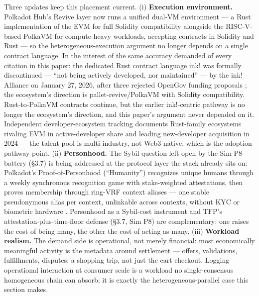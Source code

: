 \documentclass[11pt,twocolumn]{article}
\begin{document}
Three updates keep this placement current. (i)
\textbf{Execution environment.} Polkadot Hub's Revive layer now runs a
unified dual-VM environment --- a Rust implementation of the EVM for
full Solidity compatibility alongside the RISC-V-based PolkaVM for
compute-heavy workloads, accepting contracts in Solidity and Rust
\citep{parity2026hub} --- so the heterogeneous-execution argument no
longer depends on a single contract language. In the interest of the
same accuracy demanded of every citation in this paper: the dedicated
Rust contract language ink! was formally discontinued --- ``not being
actively developed, nor maintained'' --- by the ink! Alliance on January
27, 2026, after three rejected OpenGov funding proposals
\citep{ink2026}; the ecosystem's direction is pallet-revive/PolkaVM with
Solidity compatibility. Rust-to-PolkaVM contracts continue, but the
earlier ink!-centric pathway is no longer the ecosystem's direction, and
this paper's argument never depended on it. Independent
developer-ecosystem tracking \citep{electriccapital2025} documents
Rust-family ecosystems rivaling EVM in active-developer share and
leading new-developer acquisition in 2024 --- the talent pool is
multi-industry, not Web3-native, which is the adoption-pathway point.
(ii) \textbf{Personhood.} The Sybil question left open by the Sim P8
battery (§3.7) is being addressed at the protocol layer the stack
already sits on: Polkadot's Proof-of-Personhood (``Humanity'')
recognizes unique humans through a weekly synchronous recognition game
with stake-weighted attestations, then proves membership through
ring-VRF context aliases --- one stable pseudonymous alias per context,
unlinkable across contexts, without KYC or biometric hardware
\citep[DIM1/DIM2 roadmap through 2026]{parity2026pop}. Personhood as a
Sybil-cost instrument and TFP's attestation-plus-time-floor defense
(§3.7, Sim P8) are complementary: one raises the cost of being many, the
other the cost of acting as many. (iii) \textbf{Workload realism.} The
demand side is operational, not merely financial: most economically
meaningful activity is the metadata around settlement --- offers,
validations, fulfillments, disputes; a shopping trip, not just the cart
checkout. Logging operational interaction at consumer scale is a
workload no single-consensus homogeneous chain can absorb; it is exactly
the heterogeneous-parallel case this section makes.
\end{document}
